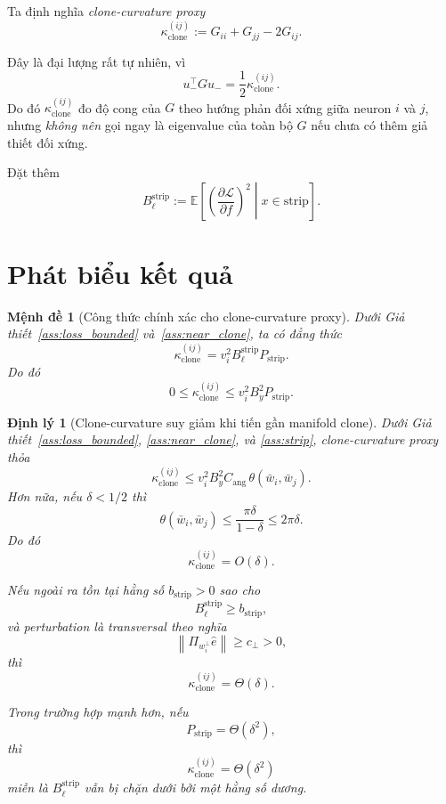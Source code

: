 \documentclass[11pt,a4paper]{article}
\newtheorem{theorem}{Định lý}
\newtheorem{proposition}{Mệnh đề}
\newcommand{\E}{\mathbb{E}}
\newcommand{\norm}[1]{\left\lVert #1 \right\rVert}
\begin{document}
Ta định nghĩa \emph{clone-curvature proxy}
\[
\kappa_{\mathrm{clone}}^{(ij)}
:=
G_{ii} + G_{jj} - 2G_{ij}.
\]

Đây là đại lượng rất tự nhiên, vì
\[
u_-^\top G u_- = \frac{1}{2}\kappa_{\mathrm{clone}}^{(ij)}.
\]
Do đó $\kappa_{\mathrm{clone}}^{(ij)}$ đo độ cong của $G$ theo hướng phản đối
xứng giữa neuron $i$ và $j$, nhưng \emph{không nên} gọi ngay là eigenvalue của
toàn bộ $G$ nếu chưa có thêm giả thiết đối xứng.

Đặt thêm
\[
B_\ell^{\mathrm{strip}}
:=
\E\!\left[
\left(\frac{\partial \mathcal L}{\partial f}\right)^2
\middle|
x \in \mathrm{strip}
\right].
\]

\section{Phát biểu kết quả}

\begin{proposition}[Công thức chính xác cho clone-curvature proxy]
\label{prop:kappa_exact}
Dưới Giả thiết~\ref{ass:loss_bounded} và~\ref{ass:near_clone}, ta có đẳng thức
\[
\kappa_{\mathrm{clone}}^{(ij)}
=
v_i^2 B_\ell^{\mathrm{strip}} P_{\mathrm{strip}}.
\]
Do đó
\[
0 \le \kappa_{\mathrm{clone}}^{(ij)} \le v_i^2 B_y^2 P_{\mathrm{strip}}.
\]
\end{proposition}

\begin{theorem}[Clone-curvature suy giảm khi tiến gần manifold clone]
\label{thm:clone_proxy}
Dưới Giả thiết~\ref{ass:loss_bounded}, \ref{ass:near_clone}, và
\ref{ass:strip}, clone-curvature proxy thỏa
\[
\kappa_{\mathrm{clone}}^{(ij)}
\le
v_i^2 B_y^2 C_{\mathrm{ang}}\, \theta(\bar w_i,\bar w_j).
\]
Hơn nữa, nếu $\delta < 1/2$ thì
\[
\theta(\bar w_i,\bar w_j) \le \frac{\pi\delta}{1-\delta} \le 2\pi\delta.
\]
Do đó
\[
\kappa_{\mathrm{clone}}^{(ij)} = O(\delta).
\]

Nếu ngoài ra tồn tại hằng số $b_{\mathrm{strip}} > 0$ sao cho
\[
B_\ell^{\mathrm{strip}} \ge b_{\mathrm{strip}},
\]
và perturbation là transversal theo nghĩa
\[
\norm{\Pi_{w_i^\perp}\hat e} \ge c_\perp > 0,
\]
thì
\[
\kappa_{\mathrm{clone}}^{(ij)} = \Theta(\delta).
\]

Trong trường hợp mạnh hơn, nếu
\[
P_{\mathrm{strip}} = \Theta(\delta^2),
\]
thì
\[
\kappa_{\mathrm{clone}}^{(ij)} = \Theta(\delta^2)
\]
miễn là $B_\ell^{\mathrm{strip}}$ vẫn bị chặn dưới bởi một hằng số dương.
\end{theorem}
\end{document}
